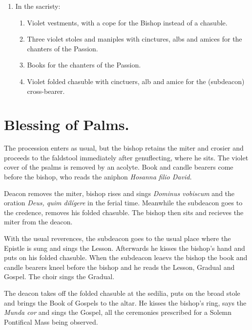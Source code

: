 {\begin{enumerate}[label=\Roman*.]
\begin{enumerate}[label=\arabic*.]
        \end{enumerate}

    \item In the sacristy:

        \begin{enumerate}[label=\arabic*.]

            \item Violet vestments, with a cope for the Bishop instead of a
                chasuble.

            \item Three violet stoles and maniples with cinctures, albs and
                amices for the chanters of the Passion.

            \item Books for the chanters of the Passion.

            \item Violet folded chasuble with cinctuers, alb and amice for the
                (subdeacon) cross-bearer.

        \end{enumerate}

\end{enumerate}

\section{Blessing of Palms.}

\rubric The procession enters as usual, but the bishop retains the miter and
crosier and proceeds to the faldstool immediately after genuflecting, where he
sits. The violet cover of the psalms is removed by an acolyte. Book and candle
bearers come before the bishop, who reads the aniphon \textit{Hosanna filio
David.}

\rubric Deacon removes the miter, bishop rises and sings \textit{Dominus
vobiscum} and the oration \textit{Deus, quim dilígere} in the ferial time.
Meanwhile the subdeacon goes to the credence, removes his folded chasuble. The
bishop then sits and recieves the miter from the deacon. 

\rubric With the usual reverences, the subdeacon goes to the usual place where
the Epistle is sung and sings the Lesson. Afterwards he kisses the bishop's
hand and puts on his folded chasuble. When the subdeacon leaevs the bishop the
book and candle bearers kneel before the bishop and he reads the Lesson,
Gradual and Gospel. The choir sings the Gradual.

\rubric The deacon takes off the folded chasuble at the sedilia, puts on the
broad stole and brings the Book of Gospels to the altar. He kisses the bishop's
ring, says the \textit{Munda cor} and sings the Gospel, all the ceremonies
prescribed for a Solemn Pontifical Mass being observed.

}
